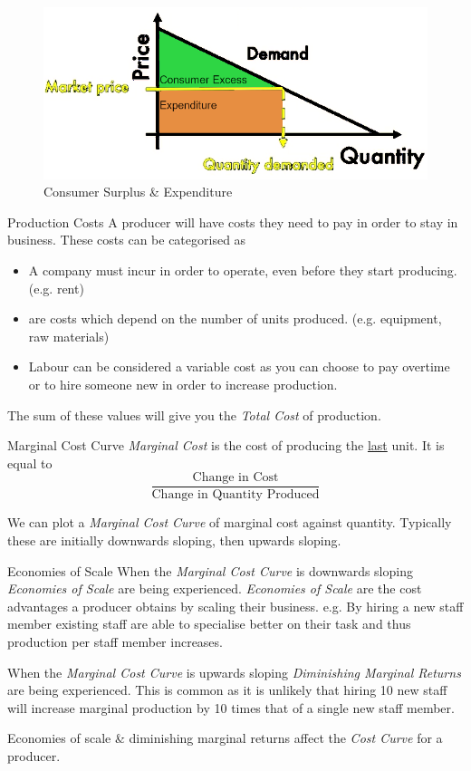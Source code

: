 \documentclass[11pt,a4paper]{article}
\begin{document}
  \begin{figure}[ht!]
    \centering
    \includegraphics[width=.5\textwidth]{consumerSurplus.PNG}
    \caption{Consumer Surplus \& Expenditure}
  \end{figure}

  \begin{definition}{Production Costs}
    A producer will have costs they need to pay in order to stay in business. These costs can be categorised as
    \begin{itemize}
      \item[\textit{Fixed Costs}] A company must incur in order to operate, even before they start producing. (e.g. rent)
      \item[\textit{Variable Costs}] are costs which depend on the number of units produced. (e.g. equipment, raw materials)
      \item[\textit{Semi-Variable Costs}] Labour can be considered a variable cost as you can choose to pay overtime or to hire someone new in order to increase production.
    \end{itemize}
    The sum of these values will give you the \textit{Total Cost} of production.
  \end{definition}

  \begin{definition}{Marginal Cost Curve}
    \textit{Marginal Cost} is the cost of producing the \underline{last} unit. It is equal to
    \[ \dfrac{\text{Change in Cost}}{\text{Change in Quantity Produced}} \]
    \par We can plot a \textit{Marginal Cost Curve} of marginal cost against quantity. Typically these are initially downwards sloping, then upwards sloping.
  \end{definition}

  \begin{definition}{Economies of Scale}
    When the \textit{Marginal Cost Curve} is downwards sloping \textit{Economies of Scale} are being experienced. \textit{Economies of Scale} are the cost advantages a producer obtains by scaling their business. e.g. By hiring a new staff member existing staff are able to specialise better on their task and thus production per staff member increases.

    \par When the \textit{Marginal Cost Curve} is upwards sloping \textit{Diminishing Marginal Returns} are being experienced. This is common as it is unlikely that hiring 10 new staff will increase marginal production by 10 times that of a single new staff member.

    \par Economies of scale \& diminishing marginal returns affect the \textit{Cost Curve} for a producer.
  \end{definition}
\end{document}
